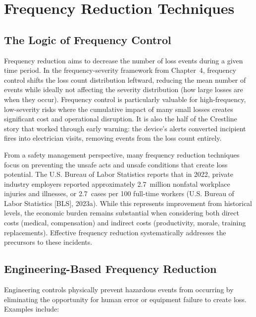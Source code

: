 \documentclass[11pt,openany]{book}
\begin{document}
\section{Frequency Reduction Techniques}
\label{sec:frequency-reduction}

\subsection{The Logic of Frequency Control}

Frequency reduction aims to decrease the number of loss events during a given
time period. In the frequency-severity framework from Chapter~4, frequency
control shifts the loss count distribution leftward, reducing the mean number
of events while ideally not affecting the severity distribution (how large
losses are when they occur). Frequency control is particularly valuable for
high-frequency, low-severity risks where the cumulative impact of many small
losses creates significant cost and operational disruption. It is also the
half of the Crestline story that worked through early warning: the device's
alerts converted incipient fires into electrician visits, removing events from
the loss count entirely.

From a safety management perspective, many frequency reduction techniques
focus on preventing the unsafe acts and unsafe conditions that create loss
potential. The U.S. Bureau of Labor Statistics reports that in 2022, private
industry employers reported approximately 2.7~million nonfatal workplace
injuries and illnesses, or 2.7~cases per 100 full-time workers (U.S. Bureau of
Labor Statistics [BLS], 2023a). While this represents improvement from
historical levels, the economic burden remains substantial when considering
both direct costs (medical, compensation) and indirect costs (productivity,
morale, training replacements). Effective frequency reduction systematically
addresses the precursors to these incidents.

\subsection{Engineering-Based Frequency Reduction}

Engineering controls physically prevent hazardous events from occurring by
eliminating the opportunity for human error or equipment failure to create
loss. Examples include:
\end{document}
